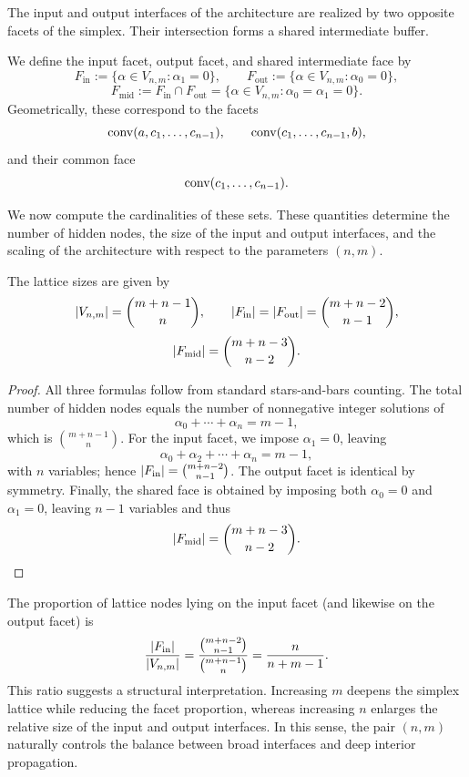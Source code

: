 The input and output interfaces of the architecture are realized by two opposite facets of the simplex. Their intersection forms a shared intermediate buffer.

\begin{definition}
We define the input facet, output facet, and shared intermediate face by
\[
F_{\mathrm{in}} := \{\alpha\in V_{n,m}: \alpha_1=0\},
\qquad
F_{\mathrm{out}} := \{\alpha\in V_{n,m}: \alpha_0=0\},
\]
\[
F_{\mathrm{mid}} := F_{\mathrm{in}}\cap F_{\mathrm{out}} = \{\alpha\in V_{n,m}: \alpha_0=\alpha_1=0\}.
\]
Geometrically, these correspond to the facets
\[
\operatorname{conv}(a,c_1,\dots,c_{n-1}),
\qquad
\operatorname{conv}(c_1,\dots,c_{n-1},b),
\]
and their common face
\[
\operatorname{conv}(c_1,\dots,c_{n-1}).
\]
\end{definition}

We now compute the cardinalities of these sets. These quantities determine the number of hidden nodes, the size of the input and output interfaces, and the scaling of the architecture with respect to the parameters $(n,m)$.

\begin{proposition}
The lattice sizes are given by
\[
\left|V_{n,m}\right| = \binom{m+n-1}{n},
\qquad
\left|F_{\mathrm{in}}\right| = \left|F_{\mathrm{out}}\right| = \binom{m+n-2}{n-1},
\]
\[
\left|F_{\mathrm{mid}}\right| = \binom{m+n-3}{n-2}.
\]
\end{proposition}

\begin{proof}
All three formulas follow from standard stars-and-bars counting. The total number of hidden nodes equals the number of nonnegative integer solutions of
\[
\alpha_0+\cdots+\alpha_n = m-1,
\]
which is $\binom{m+n-1}{n}$. For the input facet, we impose $\alpha_1=0$, leaving
\[
\alpha_0+\alpha_2+\cdots+\alpha_n=m-1,
\]
with $n$ variables; hence $\left|F_{\mathrm{in}}\right|=\binom{m+n-2}{n-1}$. The output facet is identical by symmetry. Finally, the shared face is obtained by imposing both $\alpha_0=0$ and $\alpha_1=0$, leaving $n-1$ variables and thus
\[
\left|F_{\mathrm{mid}}\right|=\binom{m+n-3}{n-2}.
\]
\end{proof}

\begin{remark}
The proportion of lattice nodes lying on the input facet (and likewise on the output facet) is
\[
\frac{\left|F_{\mathrm{in}}\right|}{\left|V_{n,m}\right|}
=
\frac{\binom{m+n-2}{n-1}}{\binom{m+n-1}{n}}
=
\frac{n}{n+m-1}.
\]
This ratio suggests a structural interpretation. Increasing $m$ deepens the simplex lattice while reducing the facet proportion, whereas increasing $n$ enlarges the relative size of the input and output interfaces. In this sense, the pair $(n,m)$ naturally controls the balance between broad interfaces and deep interior propagation.
\end{remark}
